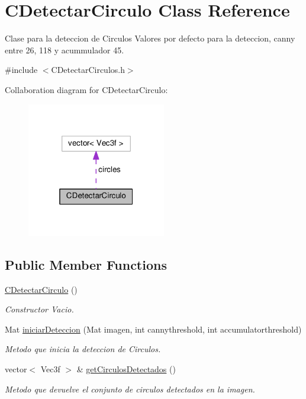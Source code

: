 \hypertarget{classCDetectarCirculo}{}\section{C\+Detectar\+Circulo Class Reference}
\label{classCDetectarCirculo}


Clase para la deteccion de Circulos Valores por defecto para la deteccion, canny entre 26, 118 y acummulador 45.  




{\ttfamily \#include $<$C\+Detectar\+Circulos.\+h$>$}



Collaboration diagram for C\+Detectar\+Circulo\+:
\nopagebreak
\begin{figure}[H]
\begin{center}
\leavevmode
\includegraphics[width=172pt]{classCDetectarCirculo__coll__graph}
\end{center}
\end{figure}
\subsection*{Public Member Functions}
\begin{DoxyCompactItemize}
\item 
\hyperlink{classCDetectarCirculo_a1afdf8a823810d47823414ebcb6850a9}{C\+Detectar\+Circulo} ()
\begin{DoxyCompactList}\small\item\em Constructor Vacio. \end{DoxyCompactList}\item 
Mat \hyperlink{classCDetectarCirculo_a649c9f3888f669032bd3811c902d0ef9}{iniciar\+Deteccion} (Mat imagen, int cannythreshold, int accumulatorthreshold)
\begin{DoxyCompactList}\small\item\em Metodo que inicia la deteccion de Circulos. \end{DoxyCompactList}\item 
vector$<$ Vec3f $>$ \& \hyperlink{classCDetectarCirculo_a89a18f61d47d00280a131982d9fc642e}{get\+Circulos\+Detectados} ()
\begin{DoxyCompactList}\small\item\em Metodo que devuelve el conjunto de circulos detectados en la imagen. \end{DoxyCompactList}\end{DoxyCompactItemize}
